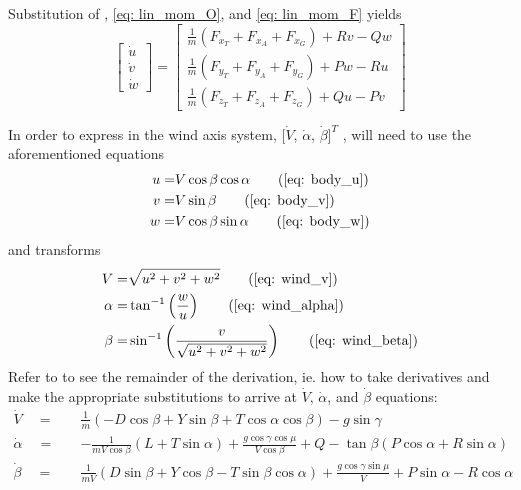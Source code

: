 \documentclass[12pt]{ucthesis}
\begin{document}
Substitution of , \ref{eq: lin_mom_O}, and \ref{eq: lin_mom_F} yields 
%
	\begin{equation}
		\left[ \begin{array}{c} \dot{u} \\ \dot{v} \\ \dot{w} \end{array}\right] = \left[ \begin{array}{c} \frac{1}{m} \left(
		F_{x_{T}} + F_{x_{A}} + F_{x_{G}} \right) + Rv - Qw\\
		\frac{1}{m} \left(F_{y_{T}} + F_{y_{A}} + F_{y_{G}} \right) + Pw - Ru \\
		\frac{1}{m} \left(F_{z_{T}} + F_{z_{A}} + F_{z_{G}} \right) + Qu - Pv
		\end{array}\right]
		\label{eq: uvw_dot}
	\end{equation}

In order to express  in the wind axis system, $[\dot{V}$, $\dot{\alpha}$, $\dot{\beta}]^T$ , will need to use the aforementioned equations
	\begin{align}
		u	=& V\cos\beta\cos\alpha 	\tag{\ref{eq: body_u}} \\
		v	=& V\sin\beta 				\tag{\ref{eq: body_v}} \\
		w	=& V\cos\beta\sin\alpha 	\tag{\ref{eq: body_w}}
	\end{align}
%
	and transforms
	\begin{align}
		V		=& \sqrt{u^{2}+v^{2}+w^{2}} \tag{\ref{eq: wind_v}} \\
		\alpha 	=& \tan^{-1}\left( \displaystyle \frac{w}{u} \right) \tag{\ref{eq: wind_alpha}} \\
		\beta	=& \sin^{-1} \left( \displaystyle \frac{v}{\sqrt{u^{2}+v^{2}+w^{2}}} \right) \tag{\ref{eq: wind_beta}}
	\end{align}
%
Refer to \citet[Appendix B.]{Duke1988} to see the remainder of the derivation, ie. how to take derivatives and make the appropriate substitutions to arrive at $\dot{V}$, $\dot{\alpha}$, and $\dot{\beta}$ equations:
	\begin{align*}
		\dot{V} 	\quad=\quad&  \frac{1}{m}\left(- D\cos\beta + Y\sin\beta + T\cos\alpha\cos\beta \right) - g\sin\gamma \\
		\dot{\alpha}\quad=\quad& -\frac{1}{mV\cos\beta}\left(L + T\sin\alpha \right) + \frac{g\cos\gamma\cos\mu}{V\cos\beta} + Q  - \tan\beta\left(P\cos\alpha + R\sin\alpha\right) \\
		\dot{\beta} \quad=\quad&  \frac{1}{mV}\left(D\sin\beta + Y\cos\beta - T\sin\beta\cos\alpha \right) + \frac{g\cos\gamma\sin\mu}{V} + P\sin\alpha - R\cos\alpha
	\end{align*}
%
\end{document}
